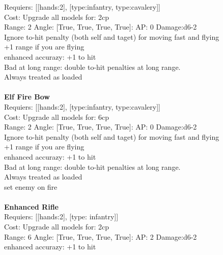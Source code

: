 Requiers: [[hands:2], [type:infantry, type:cavalery]] \\
Cost: Upgrade all models for: 2cp \\


Range: 2  Angle: [True, True, True, True]: AP: 0 Damage:d6-2 \\
Ignore to-hit penalty (both self and taget) for moving fast and flying\\ 
+1 range if you are flying\\ 
enhanced accurazy: +1 to hit\\ 
Bad at long range: double to-hit penalties at long range.\\ 
Always treated as loaded\\ 








\ \\
{\bf Elf Fire Bow } \\

Requiers: [[hands:2], [type:infantry, type:cavalery]] \\
Cost: Upgrade all models for: 6cp \\


Range: 2  Angle: [True, True, True, True]: AP: 0 Damage:d6-2 \\
Ignore to-hit penalty (both self and taget) for moving fast and flying\\ 
+1 range if you are flying\\ 
enhanced accurazy: +1 to hit\\ 
Bad at long range: double to-hit penalties at long range.\\ 
Always treated as loaded\\ 
set enemy on fire\\ 








\ \\
{\bf Enhanced Rifle } \\

Requiers: [[hands:2], [type: infantry]] \\
Cost: Upgrade all models for: 2cp \\


Range: 6  Angle: [True, True, True, True]: AP: 2 Damage:d6-2 \\
enhanced accurazy: +1 to hit\\ 








